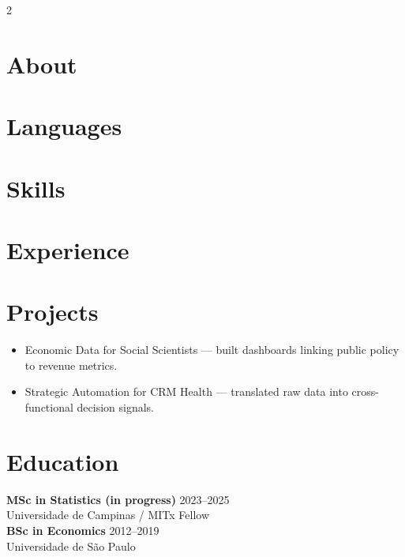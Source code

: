 \documentclass[11pt]{article}
\begin{document}
\pagestyle{empty}


\vspace{3.4cm}

\begin{paracol}{2}
\setlength{\columnsep}{1.4cm}
\sloppy

\begin{leftcolumn}
  \section*{About}
  \justify\ResumeTagline
  \ResumeHighlights
  \section*{Languages}
  \ResumeLanguages
  \section*{Skills}
  \ResumeSkills
\end{leftcolumn}

\begin{rightcolumn}
  \section*{Experience}
  \ResumeExperience
  \section*{Projects}
  \begin{itemize}
    \item Economic Data for Social Scientists — built dashboards linking public policy to revenue metrics.
    \item Strategic Automation for CRM Health — translated raw data into cross-functional decision signals.
  \end{itemize}
  \section*{Education}
  \textbf{MSc in Statistics (in progress)} \hfill 2023--2025 \\
  Universidade de Campinas / MITx Fellow \\
  \textbf{BSc in Economics} \hfill 2012--2019 \\
  Universidade de São Paulo
\end{rightcolumn}
\end{paracol}
\end{document}
